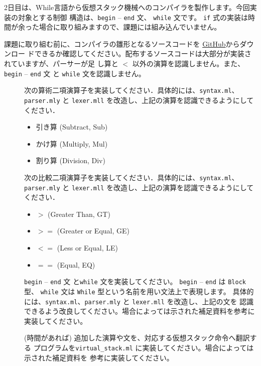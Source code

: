 \documentclass[a4paper,11pt]{jsarticle}
\begin{document}
2日目は、While言語から仮想スタック機械へのコンパイラを製作します。今回実装の対象とする制御
構造は、\verb|begin| -- \verb|end| 文、 \verb|while| 文です。
\verb|if| 式の実装は時間が余った場合に取り組みますので、課題には組み込んでいません。

課題に取り組む前に、コンパイラの雛形となるソースコードを
\href{https://github.com/tmu-compiler-info-sys-exp-I/compiler-day2}{GitHub}からダウンロー
ドできるか確認してください。配布するソースコードは大部分が実装されていますが、パーサーが足
し算と $<$ 以外の演算を認識しません。また、
\verb|begin| -- \verb|end| 文 と \verb|while| 文を認識しません。

\begin{description}
\item [] 次の算術二項演算子を実装してください．具体的には、\verb|syntax.ml|、
  \verb|parser.mly| と \verb|lexer.mll| を改造し、上記の演算を認識できるようにしてください．
  \begin{itemize}
  \item 引き算 (Subtract, Sub)
  \item かけ算 (Multiply, Mul)
  \item 割り算 (Division, Div)
  \end{itemize}
\item [] 次の比較二項演算子を実装してください．具体的には、\verb|syntax.ml|、
  \verb|parser.mly| と \verb|lexer.mll| を改造し、上記の演算を認識できるようにしてください．
  \begin{itemize}
  \item $>$ (Greater Than, GT)
  \item $>=$ (Greater or Equal, GE)
  \item $<=$ (Less or Equal, LE)
  \item $==$ (Equal, EQ)
  \end{itemize}
\item [] \verb|begin| -- \verb|end| 文 と\verb|while| 文を実装してください。
  \verb|begin| -- \verb|end| は \verb|Block| 型、 \verb|while| 文は \verb|While| 型という名前を用い文法上で表現します。
  具体的には、\verb|syntax.ml|、\verb|parser.mly| と \verb|lexer.mll| を改造し、上記の文を
  認識できるよう改良してください。場合によっては示された補足資料を参考に実装してください。
\item [] (時間があれば) 追加した演算や文を、対応する仮想スタック命令へ翻訳する
  プログラムを\verb|virtual_stack.ml| に実装してください。場合によっては示された補足資料を
  参考に実装してください。
\end{description}
\end{document}
